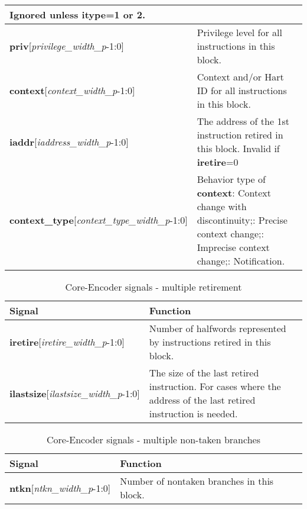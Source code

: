 \begin{table}[htp]
\begin{tabulary}{\textwidth}{|l|p{80mm}|}
    Ignored unless \textbf{itype}=1 or 2.\\
        \hline
        \textbf{priv}[\textit{privilege\_width\_p}-1:0] & Privilege level for all instructions in this block.\\
        \hline
        \textbf{context}[\textit{context\_width\_p}-1:0] & Context and/or Hart ID for all instructions in this block.\\
        \hline
        \textbf{iaddr}[\textit{iaddress\_width\_p}-1:0] & The address of the 1st instruction retired in this block.\newline
        Invalid if \textbf{iretire}=0 \\
        \hline
        \textbf{context\_type}[\textit{context\_type\_width\_p}-1:0] & Behavior type of \textbf{context}: Context change with discontinuity;: Precise context change;: Imprecise context change;: Notification.\\
        \hline
    \end{tabulary}
\end{table}

\begin{table}[htp]
    \centering
    \caption{Core-Encoder signals - multiple retirement}
    \label{tab:multi-ingress}
    \begin{tabulary}{\textwidth}{|l|p{80mm}|}
        \hline
        \textbf {Signal} & \textbf {Function} \\
        \hline
        \textbf{iretire}[\textit{iretire\_width\_p}-1:0] & Number of halfwords represented by instructions retired in this block.\\
        \hline
        \textbf{ilastsize}[\textit{ilastsize\_width\_p}-1:0] & The size of the last retired instruction. For cases where the address of the last retired instruction is needed.\\
        \hline
    \end{tabulary}
\end{table}

\begin{table}[htp]
    \centering
    \caption{Core-Encoder signals - multiple non-taken branches}
    \label{tab:multintb-ingress}
    \begin{tabulary}{\textwidth}{|l|p{80mm}|}
        \hline
        \textbf {Signal} & \textbf {Function} \\
        \hline
        \textbf{ntkn}[\textit{ntkn\_width\_p}-1:0] & Number of nontaken branches in this block.\\
        \hline
    \end{tabulary}
\end{table}


